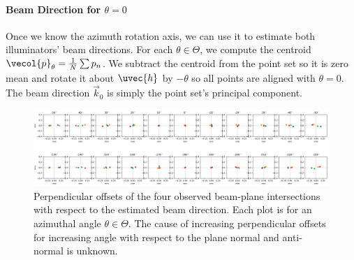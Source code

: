 \paragraph{Beam Direction for $\theta = 0$}
Once we know the azimuth rotation axis, we can use it to estimate both illuminators' beam directions. For each $\theta \in \Theta$, we compute the centroid $\vecol{p}_\theta = \frac{1}{N} \sum p_n$. We subtract the centroid from the point set so it is zero mean and rotate it about $\uvec{h}$ by $-\theta$ so all points are aligned with $\theta = 0$. The beam direction $\vec{k}_0$ is simply the point set's principal component.
%
\begin{figure}
    \centering
    \includegraphics[width=1\linewidth]{figures/beam_direction_fits.png}
    \caption{Perpendicular offsets of the four observed beam-plane intersections with respect to the estimated beam direction. Each plot is for an azimuthal angle $\theta \in \Theta$. The cause of increasing perpendicular offsets for increasing angle with respect to the plane normal and anti-normal is unknown.}
    \label{fig:beam_direction_plane_points}
\end{figure}

